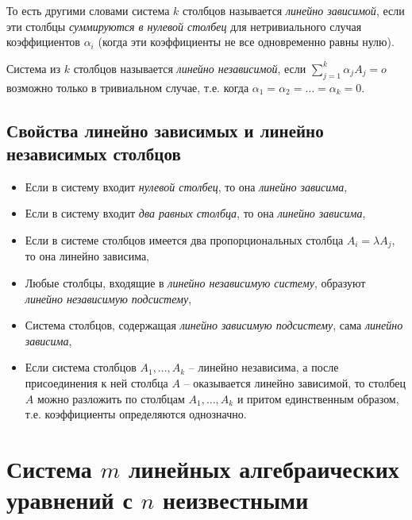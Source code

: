 \documentclass[%
	11pt,
	a4paper,
	utf8,
		]{article}
\begin{document}
То есть другими словами система $ k $ столбцов называется \emph{линейно зависимой}, если эти столбцы \emph{суммируются в нулевой столбец} для нетривиального случая коэффициентов $ \alpha_i $ (когда эти коэффициенты не все одновременно равны нулю).

Система из $ k $ столбцов называется \emph{линейно независимой}, если $ \sum\limits_{j=1}^k \alpha_j A_j = o $ возможно только в тривиальном случае, т.е. когда $ \alpha_1 = \alpha_2 = \ldots = \alpha_k = 0 $.

\subsection{Свойства линейно зависимых и линейно независимых столбцов}


\begin{itemize}
	\item Если в систему входит \emph{нулевой столбец}, то она \emph{линейно зависима},
	
	\item Если в систему входит \emph{два равных столбца}, то она \emph{линейно зависима},
	
	\item Если в системе столбцов имеется два пропорциональных столбца $ A_i = \lambda A_j $, то она линейно зависима,
	
	\item Любые столбцы, входящие в \emph{линейно независимую систему}, образуют \emph{линейно независимую подсистему},
	
	\item Система столбцов, содержащая \emph{линейно зависимую подсистему}, сама \emph{линейно зависима},
	
	\item Если система столбцов $ A_1, \ldots,A_k $ -- линейно независима, а после присоединения к ней столбца $ A $ -- оказывается линейно зависимой, то столбец $ A $ можно разложить по столбцам $ A_1, \ldots, A_k $ и притом единственным образом, т.е. коэффициенты определяются однозначно.
\end{itemize}

\section{Система $ m $ линейных алгебраических уравнений с $ n $ неизвестными}
\end{document}
